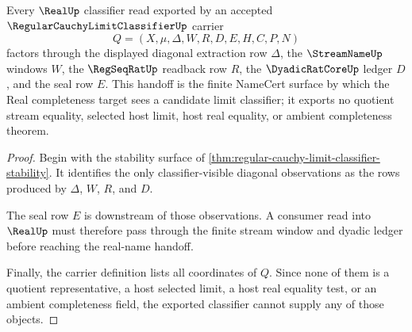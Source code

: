 \begin{theorem}
\label{thm:regular-cauchy-limit-real-seal-handoff}
Every $\RealUp$ classifier read exported by an accepted $\RegularCauchyLimitClassifierUp$ carrier
$$
Q=(X,\mu,\Delta,W,R,D,E,H,C,P,N)
$$
factors through the displayed diagonal extraction row $\Delta$, the $\StreamNameUp$ windows $W$, the $\RegSeqRatUp$ readback row $R$, the $\DyadicRatCoreUp$ ledger $D$, and the seal row $E$. This handoff is the finite NameCert surface by which the Real completeness target sees a candidate limit classifier; it exports no quotient stream equality, selected host limit, host real equality, or ambient completeness theorem.
\end{theorem}
\begin{proof}
Begin with the stability surface of \autoref{thm:regular-cauchy-limit-classifier-stability}. It identifies the only classifier-visible diagonal observations as the rows produced by $\Delta$, $W$, $R$, and $D$.

The seal row $E$ is downstream of those observations. A consumer read into $\RealUp$ must therefore pass through the finite stream window and dyadic ledger before reaching the real-name handoff.

Finally, the carrier definition lists all coordinates of $Q$. Since none of them is a quotient representative, a host selected limit, a host real equality test, or an ambient completeness field, the exported classifier cannot supply any of those objects.
\end{proof}

